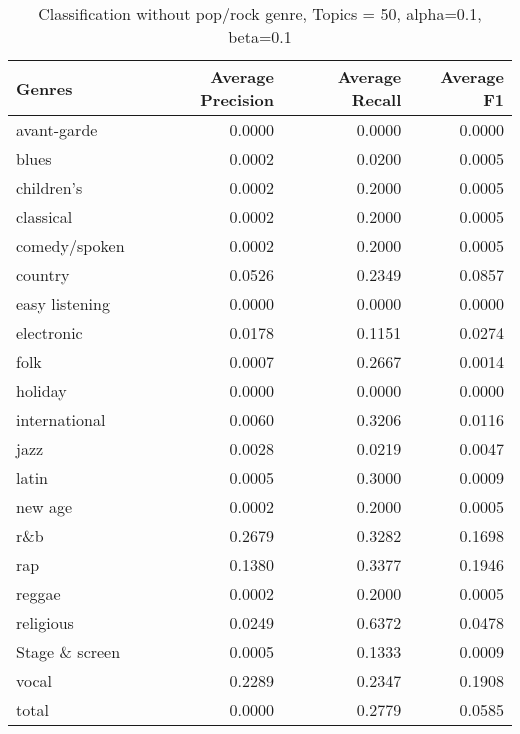 \begin{table}[h]
\begin{tabular}{|l|r|r|r|}

\hline
\textbf{Genres} &  \textbf{Average Precision} & \textbf{Average Recall} & \textbf{Average F1} \\
\hline
avant-garde & 0.0000 & 	0.0000&	0.0000\\
blues & 0.0002&	0.0200&	0.0005\\
children's & 0.0002&	0.2000	&0.0005\\
classical  & 0.0002	&0.2000&	0.0005\\
comedy/spoken & 0.0002&	0.2000	&0.0005\\
country  & 0.0526&	0.2349&	0.0857\\
easy listening & 0.0000&	0.0000&	0.0000\\
electronic & 0.0178&	0.1151&	0.0274\\
folk & 0.0007&	0.2667	&0.0014\\
holiday & 0.0000&	0.0000&	0.0000\\
international & 0.0060&	0.3206	&0.0116\\
jazz & 0.0028	&0.0219&	0.0047\\
latin & 0.0005&	0.3000&	0.0009\\
new age & 0.0002&	0.2000	&0.0005\\
r\&b & 0.2679&	0.3282&	0.1698\\
rap & 0.1380&	0.3377&	0.1946\\
reggae & 0.0002&	0.2000&	0.0005\\
religious & 0.0249&	0.6372&	0.0478\\
Stage \& screen & 0.0005	&0.1333	&0.0009\\
vocal & 0.2289	&0.2347	&0.1908\\
total& 0.0000	&0.2779&	0.0585\\
\hline
\end{tabular}
\caption{Classification without pop/rock genre, Topics = 50, alpha=0.1, beta=0.1}
\end{table}